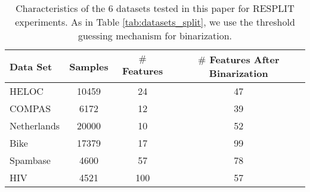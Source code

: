 \begin{table}[H]
\centering
\begin{tabular}{|l|c|c|c|}
\hline
\textbf{Data Set} & \textbf{Samples} & \textbf{$\#$ Features} & \textbf{$\#$ Features After Binarization} \\
\hline
HELOC       & 10459  & 24  & 47  \\
COMPAS      & 6172   & 12  & 39  \\
Netherlands & 20000  & 10  & 52  \\
Bike        & 17379  & 17  & 99  \\
Spambase    & 4600   & 57  & 78  \\
HIV         & 4521   & 100 & 57  \\
\hline
\end{tabular}
\caption{Characteristics of the $6$ datasets tested in this paper for RESPLIT experiments. As in Table \ref{tab:datasets_split}, we use the threshold guessing mechanism for binarization.}
\label{tab:datasets_resplit}
\end{table}

